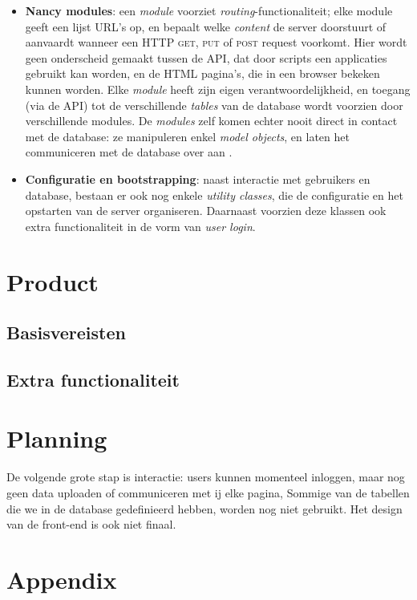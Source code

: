 \documentclass[12pt,a4paper]{article}
\begin{document}
\begin{itemize}
\item \textbf{Nancy modules}: een \emph{module} voorziet \emph{routing}-functionaliteit; elke module geeft een lijst URL's op, en bepaalt welke \emph{content} de server doorstuurt of aanvaardt wanneer een HTTP \textsc{get}, \textsc{put} of \textsc{post} request voorkomt. Hier wordt geen onderscheid gemaakt tussen de API, dat door scripts een applicaties gebruikt kan worden, en de HTML pagina's, die in een browser bekeken kunnen worden. Elke \emph{module} heeft zijn eigen verantwoordelijkheid, en toegang (via de API) tot de verschillende \emph{tables} van de database wordt voorzien door verschillende modules. De \emph{modules} zelf komen echter nooit direct in contact met de database: ze manipuleren enkel \emph{model objects}, en laten het communiceren met de database over aan .

\item \textbf{Configuratie en bootstrapping}: naast interactie met gebruikers en database, bestaan er ook nog enkele \emph{utility classes}, die de configuratie en het opstarten van de server organiseren. Daarnaast voorzien deze klassen ook extra functionaliteit in de vorm van \emph{user login}. 

\end{itemize}

\section{Product}

\subsection{Basisvereisten}

\subsection{Extra functionaliteit}

\section{Planning}
De volgende grote stap is interactie: users kunnen momenteel inloggen, maar nog
geen data uploaden of communiceren met ij elke pagina, 
Sommige van de tabellen die we in de database gedefinieerd hebben, worden nog niet gebruikt. Het design  van de front-end is ook niet finaal.

\section{Appendix}
\end{document}
